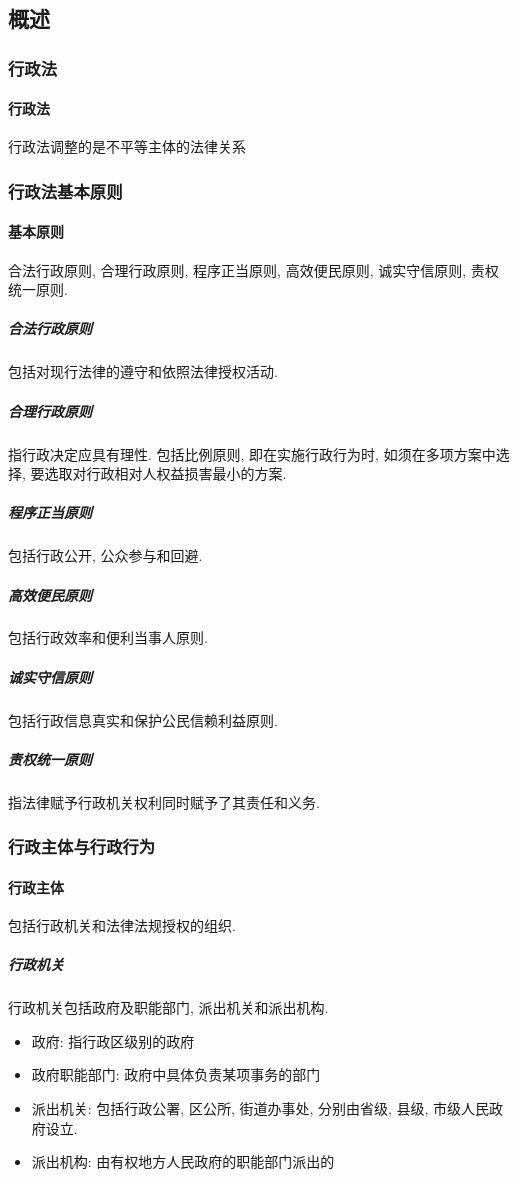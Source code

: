 \subsection{概述}

\subsubsection{行政法}

\paragraph{行政法} 行政法调整的是不平等主体的法律关系

\subsubsection{行政法基本原则}

\paragraph{基本原则} 合法行政原则, 合理行政原则, 程序正当原则, 高效便民原则, 诚实守信原则, 责权统一原则.

\subparagraph{合法行政原则} 包括对现行法律的遵守和依照法律授权活动.

\subparagraph{合理行政原则} 指行政决定应具有理性. 包括比例原则, 即在实施行政行为时, 如须在多项方案中选择, 要选取对行政相对人权益损害最小的方案.

\subparagraph{程序正当原则} 包括行政公开, 公众参与和回避.

\subparagraph{高效便民原则} 包括行政效率和便利当事人原则.

\subparagraph{诚实守信原则} 包括行政信息真实和保护公民信赖利益原则.

\subparagraph{责权统一原则} 指法律赋予行政机关权利同时赋予了其责任和义务.

\subsubsection{行政主体与行政行为}

\paragraph{行政主体} 包括行政机关和法律法规授权的组织.

\subparagraph{行政机关} 行政机关包括政府及职能部门, 派出机关和派出机构.

\begin{itemize}
	\item 政府: 指行政区级别的政府
	\item 政府职能部门: 政府中具体负责某项事务的部门
	\item 派出机关: 包括行政公署, 区公所, 街道办事处, 分别由省级, 县级, 市级人民政府设立.
	\item 派出机构: 由有权地方人民政府的职能部门派出的
\end{itemize}

